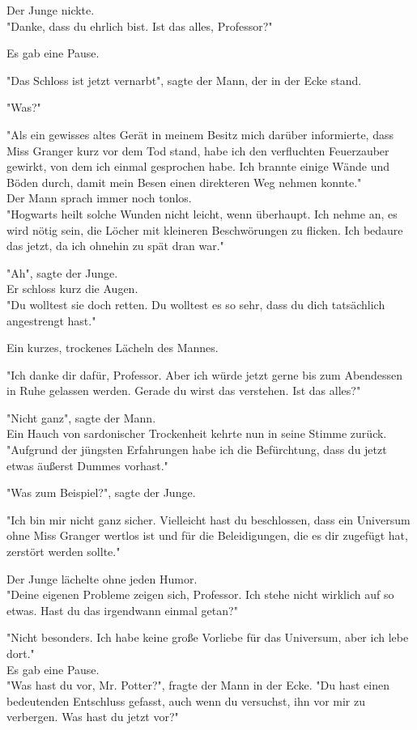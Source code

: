 {Der Junge nickte.\\ "Danke, dass du ehrlich bist. Ist das alles, Professor?"

Es gab eine Pause.

"Das Schloss ist jetzt vernarbt", sagte der Mann, der in der Ecke stand.

"Was?"

"Als ein gewisses altes Gerät in meinem Besitz mich darüber informierte, dass Miss Granger kurz vor dem Tod stand, habe ich den verfluchten Feuerzauber gewirkt, von dem ich einmal gesprochen habe. Ich brannte einige Wände und Böden durch, damit mein Besen einen direkteren Weg nehmen konnte."\\ Der Mann sprach immer noch tonlos.\\ "Hogwarts heilt solche Wunden nicht leicht, wenn überhaupt. Ich nehme an, es wird nötig sein, die Löcher mit kleineren Beschwörungen zu flicken. Ich bedaure das jetzt, da ich ohnehin zu spät dran war."

"Ah", sagte der Junge.\\ Er schloss kurz die Augen.\\ "Du wolltest sie doch retten. Du wolltest es so sehr, dass du dich tatsächlich angestrengt hast."

Ein kurzes, trockenes Lächeln des Mannes.

"Ich danke dir dafür, Professor. Aber ich würde jetzt gerne bis zum Abendessen in Ruhe gelassen werden. Gerade du wirst das verstehen. Ist das alles?"

"Nicht ganz", sagte der Mann.\\ Ein Hauch von sardonischer Trockenheit kehrte nun in seine Stimme zurück.\\ "Aufgrund der jüngsten Erfahrungen habe ich die Befürchtung, dass du jetzt etwas äußerst Dummes vorhast."

"Was zum Beispiel?", sagte der Junge.

"Ich bin mir nicht ganz sicher. Vielleicht hast du beschlossen, dass ein Universum ohne Miss Granger wertlos ist und für die Beleidigungen, die es dir zugefügt hat, zerstört werden sollte."

Der Junge lächelte ohne jeden Humor.\\ "Deine eigenen Probleme zeigen sich, Professor. Ich stehe nicht wirklich auf so etwas. Hast du das irgendwann einmal getan?"

"Nicht besonders. Ich habe keine große Vorliebe für das Universum, aber ich lebe dort."\\ Es gab eine Pause.\\ "Was hast du vor, Mr. Potter?", fragte der Mann in der Ecke. "Du hast einen bedeutenden Entschluss gefasst, auch wenn du versuchst, ihn vor mir zu verbergen. Was hast du jetzt vor?"

}
